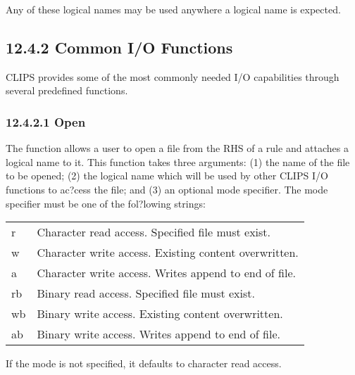 \documentclass[letterpaper,10pt,english]{sphinxmanual}
\begin{document}
Any of these logical names may be used anywhere a logical name is
expected.


\subsection{12.4.2 Common I/O Functions}
\label{\detokenize{actions:common-i-o-functions}}
CLIPS provides some of the most commonly needed I/O capabilities through
several predefined functions.


\subsubsection{12.4.2.1 Open}
\label{\detokenize{actions:open}}
The  function allows a user to open a file from the RHS of a
rule and attaches a logical name to it. This function takes three
arguments: (1) the name of the file to be opened; (2) the logical name
which will be used by other CLIPS I/O functions to ac?cess the file; and
(3) an optional mode specifier. The mode specifier must be one of the
fol?lowing strings:


\begin{savenotes}\sphinxattablestart
\centering
\begin{tabulary}{\linewidth}[t]{|T|T|}
\hline
\sphinxstyletheadfamily 
{}
&\sphinxstyletheadfamily 
{}
\\
\hline
r
&
Character read access. Specified file must exist.
\\
\hline
w
&
Character write access. Existing content overwritten.
\\
\hline
a
&
Character write access. Writes append to end of file.
\\
\hline
rb
&
Binary read access. Specified file must exist.
\\
\hline
wb
&
Binary write access. Existing content overwritten.
\\
\hline
ab
&
Binary write access. Writes append to end of file.
\\
\hline
\end{tabulary}
\par
\sphinxattableend\end{savenotes}

If the mode is not specified, it defaults to character read access.


\begin{sphinxVerbatim}[commandchars=\\\{\}]
   \PYG{p}{[}\PYG{p}{]}
\end{sphinxVerbatim}
\end{document}
